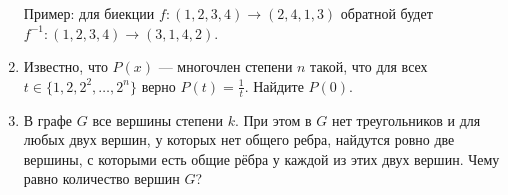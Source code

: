 \begin{enumerate}
Пример: для биекции $f: (1, 2, 3, 4) \rightarrow (2, 4, 1, 3)$ обратной будет $f^{-1}: (1,2,3,4) \rightarrow (3, 1, 4, 2)$.

\item Известно, что $P(x)$ --- многочлен степени $n$ такой, что для всех $t \in \{ 1, 2, 2^2, \hdots, 2^n \}$ верно $P(t) = \frac{1}{t}$. Найдите $P(0)$.

\item В графе $G$ все вершины степени $k$. При этом в $G$ нет треугольников и для любых двух вершин, у которых нет общего ребра, найдутся ровно две вершины, с которыми есть общие рёбра у каждой из этих двух вершин. Чему равно количество вершин $G$?

\end{enumerate}
